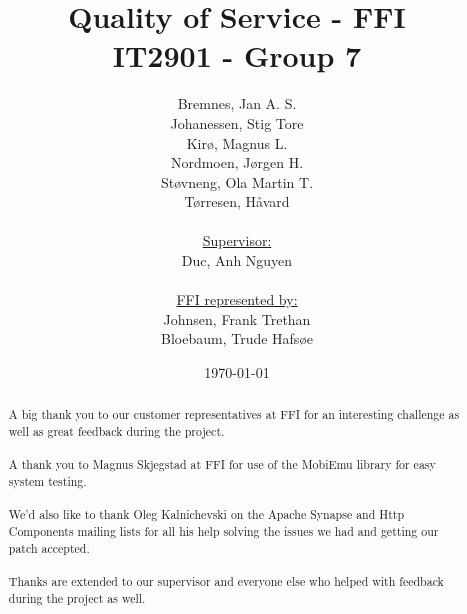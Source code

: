 \documentclass[titlepage, a4paper]{article}
\title{
    Quality of Service - FFI \\
    IT2901 - Group 7  \\ 
}
\author{
    Bremnes, Jan A. S.\\
    Johanessen, Stig Tore\\
    Kirø, Magnus L.\\
    Nordmoen, Jørgen H.\\
    Støvneng, Ola Martin T.\\
    Tørresen, Håvard\\
    \\
    \underline{Supervisor:}\\
    Duc, Anh Nguyen\\
    \\
    \underline{FFI represented by:}\\
    Johnsen, Frank Trethan \\
    Bloebaum, Trude Hafsøe
}
\date{\today}
\begin{document}
\maketitle
\begin{abstract}\label{abstract}
    
\end{abstract}
\newpage
\renewcommand{\abstractname}{Acknowledgements}
\begin{abstract}\label{acknowledgements}
    A big thank you to our customer representatives at FFI for an interesting challenge as well as great feedback during the project.
    \\\\
    A thank you to Magnus Skjegstad at FFI for use of the  MobiEmu library for easy system testing.
    \\\\
    We’d also like to thank Oleg Kalnichevski on the Apache Synapse and Http Components mailing lists for all his help solving the issues we had and getting our patch accepted.
    \\\\
    Thanks are extended to our supervisor and everyone else who helped with feedback during the project as well.
\end{abstract}
\newpage

\tableofcontents
\listoffigures
\listoflistings












\appendix










\label{Glossary}
\printglossaries





\end{document}
